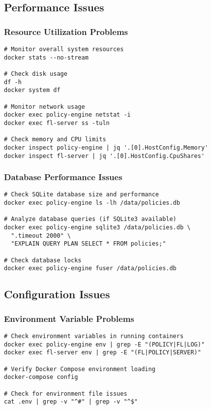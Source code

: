 \subsection{Performance Issues}

\subsubsection{Resource Utilization Problems}

\begin{lstlisting}[style=bashcode, caption=Performance Diagnostics]
# Monitor overall system resources
docker stats --no-stream

# Check disk usage
df -h
docker system df

# Monitor network usage
docker exec policy-engine netstat -i
docker exec fl-server ss -tuln

# Check memory and CPU limits
docker inspect policy-engine | jq '.[0].HostConfig.Memory'
docker inspect fl-server | jq '.[0].HostConfig.CpuShares'
\end{lstlisting}

\subsubsection{Database Performance Issues}

\begin{lstlisting}[style=bashcode, caption=Database Performance Debugging]
# Check SQLite database size and performance
docker exec policy-engine ls -lh /data/policies.db

# Analyze database queries (if SQLite3 available)
docker exec policy-engine sqlite3 /data/policies.db \
  ".timeout 2000" \
  "EXPLAIN QUERY PLAN SELECT * FROM policies;"

# Check database locks
docker exec policy-engine fuser /data/policies.db
\end{lstlisting}

\subsection{Configuration Issues}

\subsubsection{Environment Variable Problems}

\begin{lstlisting}[style=bashcode, caption=Environment Configuration Debugging]
# Check environment variables in running containers
docker exec policy-engine env | grep -E "(POLICY|FL|LOG)"
docker exec fl-server env | grep -E "(FL|POLICY|SERVER)"

# Verify Docker Compose environment loading
docker-compose config

# Check for environment file issues
cat .env | grep -v "^#" | grep -v "^$"
\end{lstlisting}

